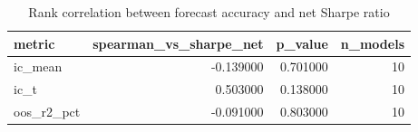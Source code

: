 \begin{table}
\caption{Rank correlation between forecast accuracy and net Sharpe ratio}
\label{tab:t1b_accuracy_vs_value}
\begin{tabular}{lrrr}
\toprule
metric & spearman\_vs\_sharpe\_net & p\_value & n\_models \\
\midrule
ic\_mean & -0.139000 & 0.701000 & 10 \\
ic\_t & 0.503000 & 0.138000 & 10 \\
oos\_r2\_pct & -0.091000 & 0.803000 & 10 \\
\bottomrule
\end{tabular}
\end{table}
